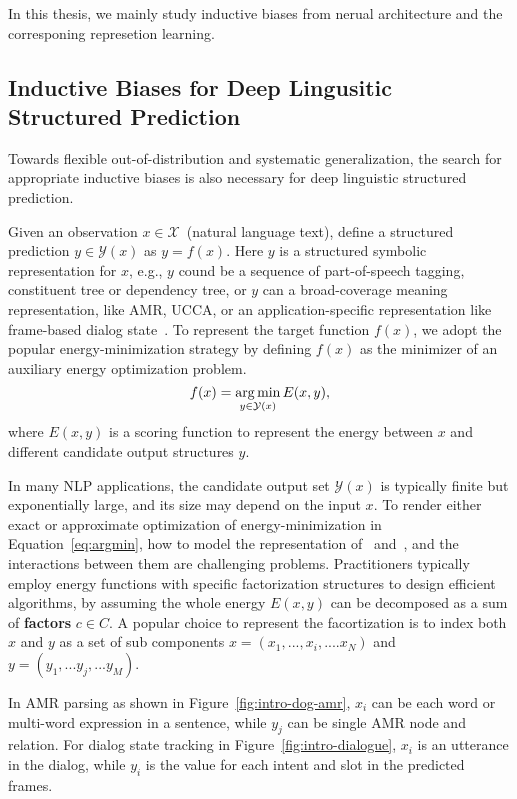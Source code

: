 In this thesis, we mainly study inductive biases from nerual
architecture and the corresponing represetion learning.

\subsection{Inductive Biases for Deep Lingusitic Structured
  Prediction}
\label{ssec:intro:bias-dsp}

Towards flexible out-of-distribution and systematic generalization,
the search for appropriate inductive biases is also necessary for
deep linguistic structured prediction.

Given an observation $x \in \mathcal{X}$~(natural language text), define
a structured prediction $y \in \mathcal{Y}(x)$ as $y=f(x)$. Here $y$ is
a structured symbolic representation for $x$, e.g., $y$ cound be a
sequence of part-of-speech tagging, constituent tree or dependency
tree, or $y$ can a broad-coverage meaning representation, like AMR,
UCCA, or an application-specific representation like frame-based
dialog state~\cite{bobrow1977gus}. To represent the target function
$f(x)$, we adopt the popular energy-minimization strategy by defining
$f(x)$ as the minimizer of an auxiliary energy optimization problem.
\begin{equation}
\label{eq:argmin}
f(x) = \operatorname*{arg\,min}_{y \in \mathcal{Y}(x)} E(x, y),
\end{equation}
where $E(x,y)$ is a scoring function to represent the energy between
$x$ and different candidate output structures $y$.

In many NLP applications, the candidate output set $\mathcal{Y}(x)$ is
typically finite but exponentially large, and its size may depend on
the input $x$. To render either exact or approximate optimization of
energy-minimization in Equation~\ref{eq:argmin}, how to model the
representation of \IN~and~\OUT, and the interactions between them are
challenging problems. Practitioners typically employ energy functions
with specific factorization structures to design efficient algorithms,
by assuming the whole energy $E(x, y)$ can be decomposed as a sum of
\textbf{factors} $c \in C$. A popular choice to represent the
facortization is to index both $x$ and $y$ as a set of sub components
$x=(x_{1},..., x_{i},.... x_{N})$ and $y=(y_{1},...y_{j},...y_{M})$.

In AMR parsing as shown in Figure~\ref{fig:intro-dog-amr}, $x_{i}$ can
be each word or multi-word expression in a sentence, while $y_{j}$ can
be single AMR node and relation.  For dialog state tracking in
Figure~\ref{fig:intro-dialogue}, $x_{i}$ is an utterance in the dialog,
while $y_{i}$ is the value for each intent and slot in the predicted
frames.

